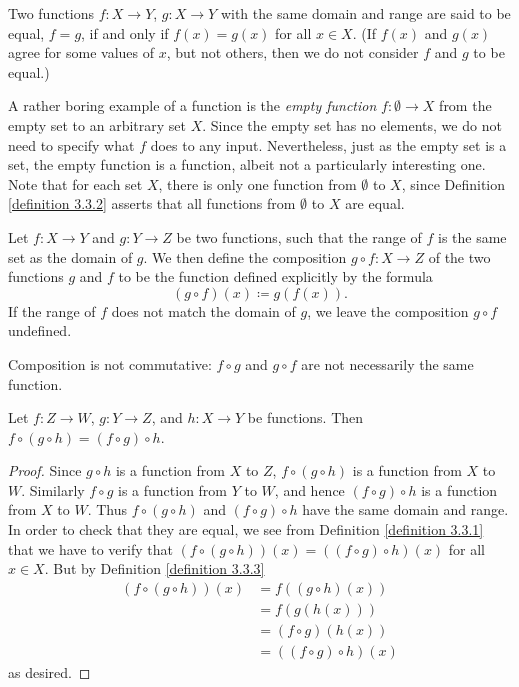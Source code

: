 \begin{definition}\label{definition 3.3.2}
Two functions \(f : X \to Y\), \(g : X \to Y\) with the same domain and range are said to be equal, \(f = g\), if and only if \(f(x) = g(x)\) for all \(x \in X\).
(If \(f(x)\) and \(g(x)\) agree for some values of \(x\), but not others, then we do not consider \(f\) and \(g\) to be equal.)
\end{definition}

A rather boring example of a function is the \emph{empty function} \(f : \emptyset \to X\) from the empty set to an arbitrary set \(X\).
Since the empty set has no elements, we do not need to specify what \(f\) does to any input.
Nevertheless, just as the empty set is a set, the empty function is a function, albeit not a particularly interesting one.
Note that for each set \(X\), there is only one function from \(\emptyset\) to \(X\), since Definition \ref{definition 3.3.2} asserts that all functions from \(\emptyset\) to \(X\) are equal.

\begin{definition}[Composition]\label{definition 3.3.3}
Let \(f : X \to Y\) and \(g : Y \to Z\) be two functions, such that the range of \(f\) is the same set as the domain of \(g\).
We then define the composition \(g \circ f : X \to Z\) of the two functions \(g\) and \(f\) to be the function defined explicitly by the formula
\[
    (g \circ f)(x) \coloneqq g(f(x)).
\]
If the range of \(f\) does not match the domain of \(g\), we leave the composition \(g \circ f\) undefined.
\end{definition}

Composition is not commutative: \(f \circ g\) and \(g \circ f\) are not necessarily the same function.

\begin{lemma}\label{lemma 3.3.1}
Let \(f : Z \to W\), \(g : Y \to Z\), and \(h : X \to Y\) be functions.
Then \(f \circ (g \circ h) = (f \circ g) \circ h\).
\end{lemma}

\begin{proof}
Since \(g \circ h\) is a function from \(X\) to \(Z\), \(f \circ (g \circ h)\) is a function from \(X\) to \(W\).
Similarly \(f \circ g\) is a function from \(Y\) to \(W\), and hence \((f \circ g) \circ h\) is a function from \(X\) to \(W\).
Thus \(f \circ (g \circ h)\) and \((f \circ g) \circ h\) have the same domain and range.
In order to check that they are equal, we see from Definition \ref{definition 3.3.1} that we have to verify that \((f \circ (g \circ h))(x) = ((f \circ g) \circ h)(x)\) for all \(x \in X\).
But by Definition \ref{definition 3.3.3}
    \begin{align*}
        (f \circ (g \circ h))(x)
        &= f((g \circ h)(x)) \\
        &= f(g(h(x))) \\
        &= (f \circ g)(h(x)) \\
        &= ((f \circ g) \circ h)(x)
    \end{align*}
as desired.
\end{proof}

